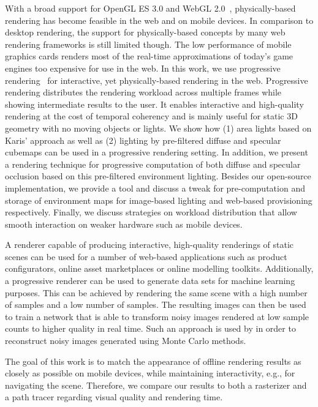 \documentclass[sigconf,authorversion]{acmart}
\begin{document}
With a broad support for OpenGL ES 3.0 and WebGL 2.0~\cite{jackson2015webgl}, physically-based rendering has become feasible in the web and on mobile devices.
In comparison to desktop rendering, the support for physically-based concepts by many web rendering frameworks is still limited though.
The low performance of mobile graphics cards renders most of the real-time approximations of today's game engines too expensive for use in the web.
In this work, we use progressive rendering~\cite{limberger2016progressive} for interactive, yet physically-based rendering in the web.
Progressive rendering distributes the rendering workload across multiple frames while showing intermediate results to the user.
It enables interactive and high-quality rendering at the cost of temporal coherency and is mainly useful for static 3D geometry with no moving objects or lights.
We show how (1) area lights based on Karis' \cite{karis2013real} approach as well as (2) lighting by pre-filtered diffuse and specular cubemaps can be used in a progressive rendering setting.
In addition, we present a rendering technique for progressive computation of both diffuse and specular occlusion based on this pre-filtered environment lighting.
Besides our open-source implementation, we provide a tool and discuss a tweak for pre-computation and storage of environment maps for image-based lighting and web-based provisioning respectively.
Finally, we discuss strategies on workload distribution that allow smooth interaction on weaker hardware such as mobile devices.

A renderer capable of producing interactive, high-quality renderings of static scenes can be used for a number of web-based applications such as product configurators, online asset marketplaces or online modelling toolkits.
Additionally, a progressive renderer can be used to generate data sets for machine learning purposes.
This can be achieved by rendering the same scene with a high number of samples and a low number of samples.
The resulting images can then be used to train a network that is able to transform noisy images rendered at low sample counts to higher quality in real time.
Such an approach is used by \cite{chaitanya2017interactive} in order to reconstruct noisy images generated using Monte Carlo methods.

The goal of this work is to match the appearance of offline rendering results as closely as possible on mobile devices, while maintaining interactivity, e.g., for navigating the scene.
Therefore, we compare our results to both a rasterizer and a path tracer regarding visual quality and rendering time.
\end{document}
